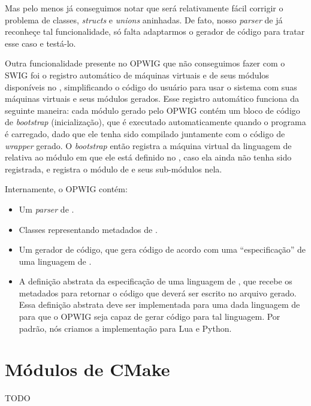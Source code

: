   Mas pelo menos já conseguimos notar que será relativamente fácil corrigir o problema de classes, 
  \textit{structs} e \textit{unions} aninhadas. De fato, nosso \textit{parser} de \CXX{} já reconheçe
  tal funcionalidade, só falta adaptarmos o gerador de código para tratar esse caso e testá-lo.
  
  Outra funcionalidade presente no OPWIG que não conseguimos fazer com o SWIG foi o registro automático
  de máquinas virtuais e de seus módulos disponíveis no \SMgr{}, simplificando o código do usuário
  para usar o sistema com suas máquinas virtuais e seus módulos gerados. Esse registro automático
  funciona da seguinte maneira: cada módulo gerado pelo OPWIG contém um bloco de código de \textit{bootstrap}
  (inicialização), que é executado automaticamente quando o programa é carregado, dado que ele tenha
  sido compilado juntamente com o código de \textit{wrapper} gerado. O \textit{bootstrap} então
  registra a máquina virtual da linguagem de \script{} relativa ao módulo em que ele está definido
  no \SMgr{}, caso ela ainda não tenha sido registrada, e registra o módulo de \script{} e seus sub-módulos
  nela.
  
  Internamente, o OPWIG contém:
  \begin{itemize}
    \item Um \textit{parser} de \CXX{}.
    \item Classes representando metadados de \CXX{}.
    \item Um gerador de código, que gera código de acordo com uma ``especificação''
      de uma linguagem de \script{}.
    \item A definição abstrata da especificação de uma linguagem de \script{}, que recebe
      os metadados para retornar o código que deverá ser escrito no arquivo gerado. Essa
      definição abstrata deve ser implementada para uma dada linguagem de \script{} para
      que o OPWIG seja capaz de gerar código para tal linguagem. Por padrão, nós criamos
      a implementação para Lua e Python.
  \end{itemize}
 
  
  \section{Módulos de CMake}
  
  TODO
